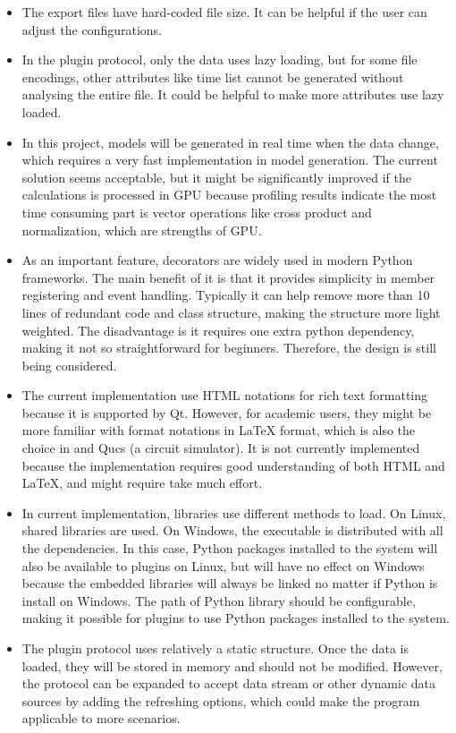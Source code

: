 \begin{itemize}
	\item The export files have hard-coded file size. It can be helpful if the user can adjust the configurations.
	\item In the plugin protocol, only the data uses lazy loading, but for some file encodings, other attributes like time list cannot be generated without analysing the entire file. It could be helpful to make more attributes use lazy loaded.
	\item In this project, models will be generated in real time when the data change, which requires a very fast implementation in model generation. The current solution seems acceptable, but it might be significantly improved if the calculations is processed in GPU because profiling results indicate the most time consuming part is vector operations like cross product and normalization, which are strengths of GPU.
	\item As an important feature, decorators are widely used in modern Python frameworks. The main benefit of it is that it provides simplicity in member registering and event handling. Typically it can help remove more than 10 lines of redundant code and class structure, making the structure more light weighted. The disadvantage is it requires one extra python dependency, making it not so straightforward for beginners. Therefore, the design is still being considered.
	\item The current implementation use HTML notations for rich text formatting because it is supported by Qt. However, for academic users, they might be more familiar with format notations in \LaTeX{} format, which is also the choice in \MatLab{} and Qucs\cite{ref:qucs} (a circuit simulator). It is not currently implemented because the implementation requires good understanding of both HTML and \LaTeX{}, and might require take much effort.
	\item In current implementation, libraries use different methods to load. On Linux, shared libraries are used. On Windows, the executable is distributed with all the dependencies. In this case, Python packages installed to the system will also be available to plugins on Linux, but will have no effect on Windows because the embedded libraries will always be linked no matter if Python is install on Windows. The path of Python library should be configurable, making it possible for plugins to use Python packages installed to the system.
	\item The plugin protocol uses relatively a static structure. Once the data is loaded, they will be stored in memory and should not be modified. However, the protocol can be expanded to accept data stream or other dynamic data sources by adding the refreshing options, which could make the program applicable to more scenarios.
\end{itemize} 

